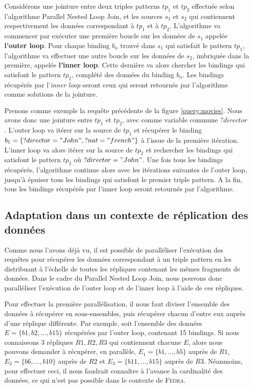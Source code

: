 \documentclass[a4paper]{article}
\def\fedra{\textsc{Fedra}\xspace}
\begin{document}
Considérons une jointure entre deux triples patterns $tp_1$ et $tp_2$ effectuée selon l'algorithme Parallel Nested Loop Join, et les sources $s_1$ et $s_2$ qui contiennent respectivement les données correspondant à $tp_1$ et à $tp_2$. L'algorithme va commencer par exécuter une première boucle sur les données de $s_1$ appelée \textbf{l'outer loop}. Pour chaque binding $b_n$ trouvé dans $s_1$ qui satisfait le pattern $tp_1$, l'algorithme va effectuer une autre boucle sur les données de $s_2$, imbriquée dans la première, appelée \textbf{l'inner loop}. Cette dernière va alors chercher les bindings qui satisfont le pattern $tp_2$, complété des données du binding $b_n$. Les bindings récupérés par l'\textit{inner loop} seront ceux qui seront retournés par l'algorithme comme solutions de la jointure.

Prenons comme exemple la requête précédente de la figure \ref{query:movies}. Nous avons donc une jointure entre $tp_1$ et $tp_2$, avec comme variable commune $?director$. L'outer loop va itérer sur la source de $tp_1$ et récupérer le binding $b_1 = \{ ?director = "John", ?nat = "french" \}$ à l'issue de la première itération. L'inner loop va alors itérer sur la source de $tp_2$ et rechercher les bindings qui satisfont le pattern $tp_2$ où $?director = "John"$. Une fois tous les bindings récupérés, l'algorithme continue alors avec les itérations suivantes de l'outer loop, jusqu'à épuiser tous les bindings qui satisfont le premier triple pattern. A la fin, tous les bindings récupérés par l'inner loop seront retournés par l'algorithme.

\subsection{Adaptation dans un contexte de réplication des données}

Comme nous l'avons déjà vu, il est possible de paralléliser l'exécution des requêtes pour récupérer les données correspondant à un triple pattern en les distribuant à l'échelle de toutes les répliques contenant les mêmes fragments de données. Dans le cadre du Parallel Nested Loop Join, nous pouvons donc paralléliser l'exécution de l'outer loop et de l'inner loop à l'aide de ces répliques.

Pour effectuer la première parallélisation, il nous faut diviser l'ensemble des données à récupérer en sous-ensembles, puis récupérer chacun d'entre eux auprès d'une réplique différente. Par exemple, soit l'ensemble des données $E = \{ b1, b2, \dots, b15 \}$ récupérées par l'outer loop, contenant 15 bindings. Si nous connaissons 3 répliques $R1, R2, R3$ qui contiennent chacune $E$, alors nous pouvons demander à récupérer, en parallèle, $E_1 = \{ b1, \dots, b5 \}$ auprès de $R1$, $E_2 = \{ b6, \dots, b10 \}$ auprès de $R2$ et $E_3 = \{ b11, \dots, b15 \}$ auprès de $R3$. Néanmoins, pour effectuer ceci, il nous faudrait connaître à l'avance la cardinalité des données, ce qui n'est pas possible dans le contexte de \fedra. 
\end{document}
